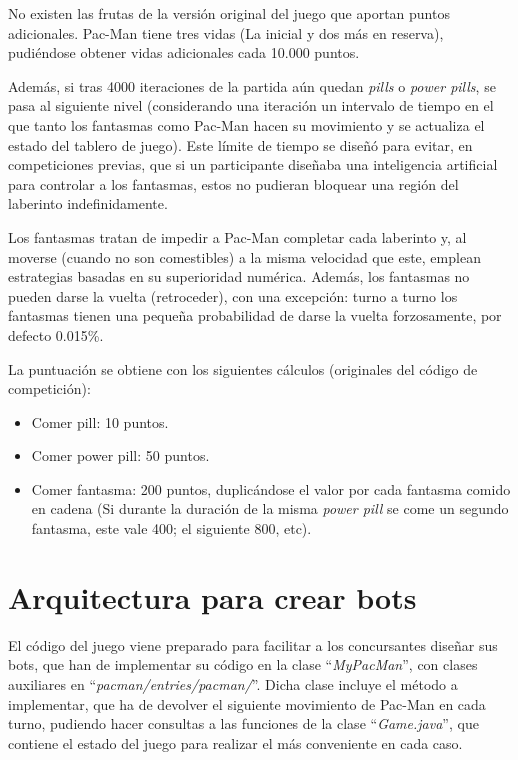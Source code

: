 No existen las frutas de la versión original del juego que aportan puntos adicionales.
Pac-Man tiene tres vidas (La inicial y dos más en reserva), pudiéndose obtener vidas adicionales cada 10.000 puntos.

Además, si tras 4000 iteraciones de la partida aún quedan \textit{pills} o \textit{power pills}, se pasa al siguiente nivel (considerando una iteración un intervalo de tiempo en el que tanto los fantasmas como Pac-Man hacen su movimiento y se actualiza el estado del tablero de juego). Este límite de tiempo se diseñó para evitar, en competiciones previas, que si un participante diseñaba una inteligencia artificial para controlar a los fantasmas, estos no pudieran bloquear una región del laberinto indefinidamente.
 
Los fantasmas tratan de impedir a Pac-Man completar cada laberinto y, al moverse (cuando no son comestibles) a la misma velocidad que este, emplean estrategias basadas en su superioridad numérica. Además, los fantasmas no pueden darse la vuelta (retroceder), con una excepción: turno a turno los fantasmas tienen una pequeña probabilidad de darse la vuelta forzosamente, por defecto 0.015\%.
 
La puntuación se obtiene con los siguientes cálculos (originales del código de competición):
\begin{itemize}
\item Comer pill: 10 puntos.
\item Comer power pill: 50 puntos.
\item Comer fantasma: 200 puntos, duplicándose el valor por cada fantasma comido en cadena (Si durante la duración de la misma \textit{power pill} se come un segundo fantasma, este vale 400; el siguiente 800, etc).
\end{itemize}

\section{Arquitectura para crear bots}
El código del juego viene preparado para facilitar a los concursantes diseñar sus bots, que han de implementar su código en la clase ``\textit{MyPacMan}'', con clases auxiliares en ``\textit{pacman/entries/pacman/}''. Dicha clase incluye el método a implementar, que ha de devolver el siguiente movimiento de Pac-Man en cada turno, pudiendo hacer consultas a las funciones de la clase ``\textit{Game.java}'', que contiene el estado del juego para realizar el más conveniente en cada caso.
 
